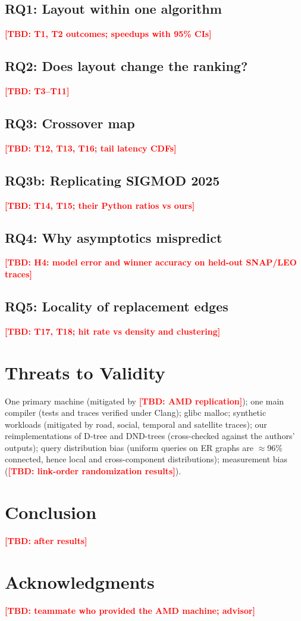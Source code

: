 \documentclass[conference]{IEEEtran}
\newcommand{\TBD}[1]{\textcolor{red}{\textbf{[TBD: #1]}}}
\newcommand{\FIG}[1]{\fbox{\parbox{0.92\columnwidth}{\centering\vspace{1.2cm}\textcolor{gray}{Figure placeholder: #1}\vspace{1.2cm}}}}
\begin{document}
\subsection{RQ1: Layout within one algorithm}
\FIG{ns/op and LLC misses/op vs V for ETT P0, F0, F1, F2, with L2/L3 boundaries}
\TBD{T1, T2 outcomes; speedups with 95\% CIs}

\subsection{RQ2: Does layout change the ranking?}
\FIG{Algorithm x layout ranking (ETT, HDT, D-tree; P0 vs F2)}
\TBD{T3--T11}

\subsection{RQ3: Crossover map}
\FIG{Fastest structure over query fraction x V, one panel per query distribution}
\TBD{T12, T13, T16; tail latency CDFs}

\subsection{RQ3b: Replicating SIGMOD 2025}
\TBD{T14, T15; their Python ratios vs ours}

\subsection{RQ4: Why asymptotics mispredict}
\FIG{Top-down stall breakdown per structure}
\TBD{H4: model error and winner accuracy on held-out SNAP/LEO traces}

\subsection{RQ5: Locality of replacement edges}
\TBD{T17, T18; hit rate vs density and clustering}

\section{Threats to Validity}
One primary machine (mitigated by \TBD{AMD replication}); one main compiler (tests and traces verified under Clang); glibc malloc; synthetic workloads (mitigated by road, social, temporal and satellite traces); our reimplementations of D-tree and DND-trees (cross-checked against the authors' outputs); query distribution bias (uniform queries on ER graphs are $\approx$96\% connected, hence local and cross-component distributions); measurement bias~\cite{mytkowicz2009} (\TBD{link-order randomization results}).

\section{Conclusion}
\TBD{after results}

\section*{Acknowledgments}
\TBD{teammate who provided the AMD machine; advisor}



\end{document}
